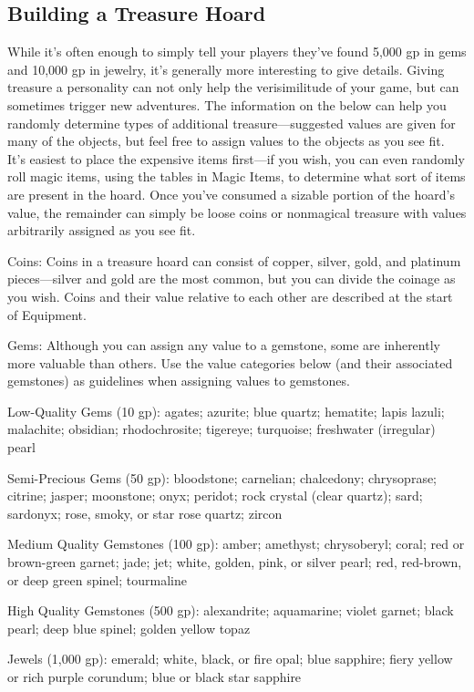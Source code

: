 \subsection{Building a Treasure Hoard}

				
While it's often enough to simply tell your players they've found 5,000 gp in gems and 10,000 gp in jewelry, it's generally more interesting to give details. Giving treasure a personality can not only help the verisimilitude of your game, but can sometimes trigger new adventures. The information on the below can help you randomly determine types of additional treasure---suggested values are given for many of the objects, but feel free to assign values to the objects as you see fit. It's easiest to place the expensive items first---if you wish, you can even randomly roll magic items, using the tables in Magic Items, to determine what sort of items are present in the hoard. Once you've consumed a sizable portion of the hoard's value, the remainder can simply be loose coins or nonmagical treasure with values arbitrarily assigned as you see fit.
				
Coins: Coins in a treasure hoard can consist of copper, silver, gold, and platinum pieces---silver and gold are the most common, but you can divide the coinage as you wish. Coins and their value relative to each other are described at the start of Equipment.
				
Gems: Although you can assign any value to a gemstone, some are inherently more valuable than others. Use the value categories below (and their associated gemstones) as guidelines when assigning values to gemstones.
				
Low-Quality Gems (10 gp): agates; azurite; blue quartz; hematite; lapis lazuli; malachite; obsidian; rhodochrosite; tigereye; turquoise; freshwater (irregular) pearl
				
Semi-Precious Gems (50 gp): bloodstone; carnelian; chalcedony; chrysoprase; citrine; jasper; moonstone; onyx; peridot; rock crystal (clear quartz); sard; sardonyx; rose, smoky, or star rose quartz; zircon
				
Medium Quality Gemstones (100 gp): amber; amethyst; chrysoberyl; coral; red or brown-green garnet; jade; jet; white, golden, pink, or silver pearl; red, red-brown, or deep green spinel; tourmaline
				
High Quality Gemstones (500 gp): alexandrite; aquamarine; violet garnet; black pearl; deep blue spinel; golden yellow topaz
				
Jewels (1,000 gp): emerald; white, black, or fire opal; blue sapphire; fiery yellow or rich purple corundum; blue or black star sapphire
				
